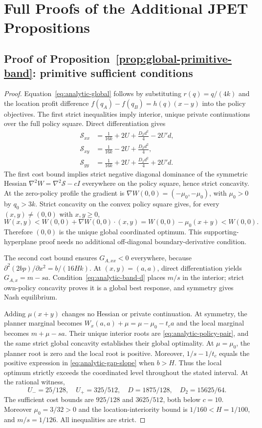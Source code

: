 \section{Full Proofs of the Additional JPET Propositions}\label{app:jpet-additional-proofs}

\subsection{Proof of Proposition~\ref{prop:global-primitive-band}: primitive sufficient conditions}\label{app:jpet-additional-proof-1}

\begin{proof}
Equation~\eqref{eq:analytic-global} follows by substituting
$r(q)=q/(4k)$ and the location profit difference
$f(q_A)-f(q_B)=h(q)(x-y)$ into the policy objectives.
The first strict inequalities imply interior, unique private
continuations over the full policy square.
Direct differentiation gives
\begin{align*}
\mathcal S_{xx}
&=\frac1{16k}+2U+\frac{D_2d^2}{4}-2U'd,\\
\mathcal S_{xy}
&=\frac1{16k}-2U+\frac{D_2d^2}{4},\\
\mathcal S_{yy}
&=\frac1{16k}+2U+\frac{D_2d^2}{4}+2U'd.
\end{align*}
The first cost bound implies strict negative diagonal dominance
of the symmetric Hessian $\nabla^2 W=\nabla^2\mathcal S-cI$
everywhere on the policy square, hence strict concavity.
At the zero-policy profile the gradient is
$\nabla W(0,0)=(-\mu_0,-\mu_0)$, with $\mu_0>0$
by $q_0>3k$. Strict concavity on the convex policy
square gives, for every $(x,y)\ne(0,0)$ with
$x,y\ge0$,
\[
W(x,y)< W(0,0)+\nabla W(0,0)\cdot(x,y)
= W(0,0)-\mu_0(x+y)<W(0,0).
\]
Therefore $(0,0)$ is the unique global coordinated
optimum. This supporting-hyperplane proof needs no
additional off-diagonal boundary-derivative condition.

The second cost bound ensures $G_{A,xx}<0$ everywhere, because
$\partial^2(2bp)/\partial x^2=b/(16Hk)$.
At $(x,y)=(a,a)$, direct differentiation yields
$G_{A,x}=m-sa$. Condition~\eqref{eq:analytic-band-d}
places $m/s$ in the interior; strict own-policy concavity proves
it is a global best response, and symmetry gives Nash equilibrium.

Adding $\mu(x+y)$ changes no Hessian or private continuation.
At symmetry, the planner marginal becomes
$W_x(a,a)+\mu=\mu-\mu_0-t_ca$ and the local marginal becomes
$m+\mu-sa$. Their unique interior roots are
\eqref{eq:analytic-policy-pair}, and the same strict global
concavity establishes their global optimality.
At $\mu=\mu_0$, the planner root is zero and the local root
is positive. Moreover, $1/s-1/t_c$ equals the positive expression
in \eqref{eq:analytic-gap-slope} when $b>H$.
Thus the local optimum strictly exceeds the coordinated level
throughout the stated interval. At the rational witness,
\[
U_-=25/128,\quad U_+=325/512,\quad
D=1875/128,\quad D_2=15625/64.
\]
The sufficient cost bounds are $925/128$ and $3625/512$,
both below $c=10$. Moreover $\mu_0=3/32>0$ and
the location-interiority bound is $1/160<H=1/100$,
and $m/s=1/126$. All inequalities are strict.
\end{proof}

